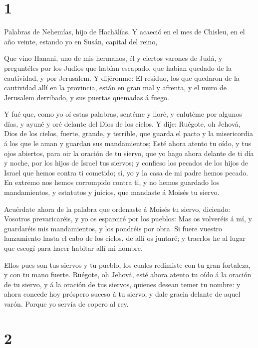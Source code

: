 \hypertarget{section}{%
\section{1}\label{section}}

 Palabras de Nehemías, hijo de Hachâlías. Y acaeció en el
mes de Chisleu, en el año veinte, estando yo en Susán, capital del
reino,

 Que vino Hanani, uno de mis hermanos, él y ciertos varones
de Judá, y preguntéles por los Judíos que habían escapado, que habían
quedado de la cautividad, y por Jerusalem.  Y dijéronme: El
residuo, los que quedaron de la cautividad allí en la provincia, están
en gran mal y afrenta, y el muro de Jerusalem derribado, y sus puertas
quemadas á fuego.

 Y fué que, como yo oí estas palabras, sentéme y lloré, y
enlutéme por algunos días, y ayuné y oré delante del Dios de los cielos.
 Y dije: Ruégote, oh Jehová, Dios de los cielos, fuerte,
grande, y terrible, que guarda el pacto y la misericordia á los que le
aman y guardan sus mandamientos;  Esté ahora atento tu oído,
y tus ojos abiertos, para oir la oración de tu siervo, que yo hago ahora
delante de ti día y noche, por los hijos de Israel tus siervos; y
confieso los pecados de los hijos de Israel que hemos contra ti
cometido; sí, yo y la casa de mi padre hemos pecado.  En
extremo nos hemos corrompido contra ti, y no hemos guardado los
mandamientos, y estatutos y juicios, que mandaste á Moisés tu siervo.

 Acuérdate ahora de la palabra que ordenaste á Moisés tu
siervo, diciendo: Vosotros prevaricaréis, y yo os esparciré por los
pueblos:  Mas os volveréis á mí, y guardaréis mis
mandamientos, y los pondréis por obra. Si fuere vuestro lanzamiento
hasta el cabo de los cielos, de allí os juntaré; y traerlos he al lugar
que escogí para hacer habitar allí mi nombre.

 Ellos pues son tus siervos y tu pueblo, los cuales
redimiste con tu gran fortaleza, y con tu mano fuerte. 
Ruégote, oh Jehová, esté ahora atento tu oído á la oración de tu siervo,
y á la oración de tus siervos, quienes desean temer tu nombre: y ahora
concede hoy próspero suceso á tu siervo, y dale gracia delante de aquel
varón. Porque yo servía de copero al rey.

\hypertarget{section-1}{%
\section{2}\label{section-1}}

